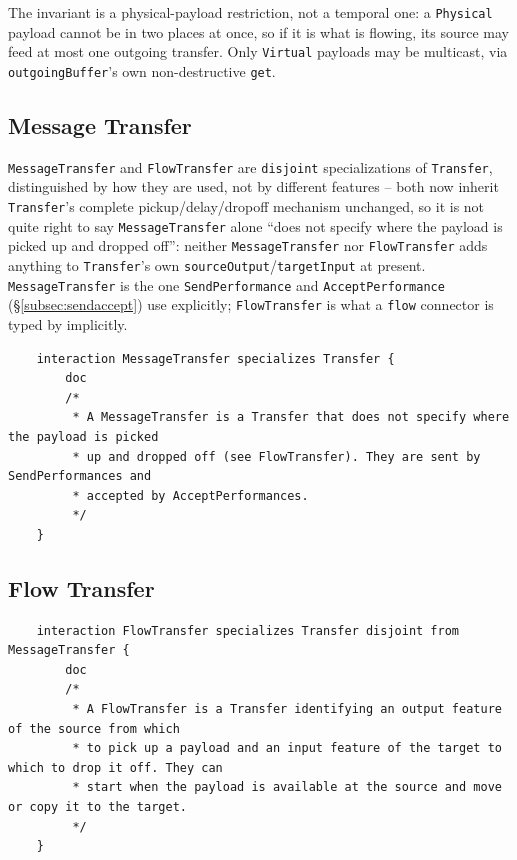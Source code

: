 \pn The invariant is a physical-payload restriction, not a temporal one: a \texttt{Physical}
payload cannot be in two places at once, so if it is what is flowing, its source may feed at most
one outgoing transfer.  Only \texttt{Virtual} payloads may be multicast, via
\texttt{outgoingBuffer}'s own non-destructive \texttt{get}.

\subsection{Message Transfer}\label{subsec:messagetransfer}

\pn \texttt{MessageTransfer} and \texttt{FlowTransfer} are \texttt{disjoint} specializations of
\texttt{Transfer}, distinguished by how they are used, not by different features -- both now
inherit \texttt{Transfer}'s complete pickup/delay/dropoff mechanism unchanged, so it is not quite
right to say \texttt{MessageTransfer} alone ``does not specify where the payload is picked up and
dropped off'': neither \texttt{MessageTransfer} nor \texttt{FlowTransfer} adds anything to
\texttt{Transfer}'s own \texttt{sourceOutput}/\texttt{targetInput} at present.
\texttt{MessageTransfer} is the one \texttt{SendPerformance} and \texttt{AcceptPerformance}
(\S\ref{subsec:sendaccept}) use explicitly; \texttt{FlowTransfer} is what a \texttt{flow} connector
is typed by implicitly.

\begin{lstlisting}
	interaction MessageTransfer specializes Transfer {
		doc
		/*
		 * A MessageTransfer is a Transfer that does not specify where the payload is picked
		 * up and dropped off (see FlowTransfer). They are sent by SendPerformances and
		 * accepted by AcceptPerformances.
		 */
	}
\end{lstlisting}

\subsection{Flow Transfer}\label{subsec:flowtransfer}
\begin{lstlisting}
	interaction FlowTransfer specializes Transfer disjoint from MessageTransfer {
		doc
		/*
		 * A FlowTransfer is a Transfer identifying an output feature of the source from which
		 * to pick up a payload and an input feature of the target to which to drop it off. They can
		 * start when the payload is available at the source and move or copy it to the target.
		 */
	}
\end{lstlisting}

